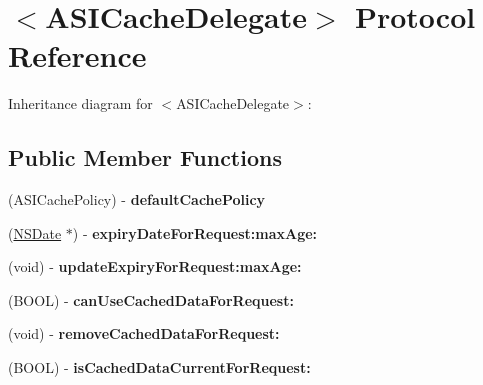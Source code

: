 \hypertarget{protocol_a_s_i_cache_delegate-p}{
\section{$<$\-A\-S\-I\-Cache\-Delegate$>$ \-Protocol \-Reference}
\label{protocol_a_s_i_cache_delegate-p}
}


\-Inheritance diagram for $<$\-A\-S\-I\-Cache\-Delegate$>$\-:
\subsection*{\-Public \-Member \-Functions}
\begin{DoxyCompactItemize}
\item 
\hypertarget{protocol_a_s_i_cache_delegate-p_a1207aea079945294e7bb48c621d82a67}{
(\-A\-S\-I\-Cache\-Policy) -\/ {\bfseries default\-Cache\-Policy}}
\label{protocol_a_s_i_cache_delegate-p_a1207aea079945294e7bb48c621d82a67}

\item 
\hypertarget{protocol_a_s_i_cache_delegate-p_a36d0b83c9017dba94a93acc3cae9aa65}{
(\hyperlink{class_n_s_date}{\-N\-S\-Date} $\ast$) -\/ {\bfseries expiry\-Date\-For\-Request\-:max\-Age\-:}}
\label{protocol_a_s_i_cache_delegate-p_a36d0b83c9017dba94a93acc3cae9aa65}

\item 
\hypertarget{protocol_a_s_i_cache_delegate-p_ad793f424847f6f7a2c5154fb8cec1bb6}{
(void) -\/ {\bfseries update\-Expiry\-For\-Request\-:max\-Age\-:}}
\label{protocol_a_s_i_cache_delegate-p_ad793f424847f6f7a2c5154fb8cec1bb6}

\item 
\hypertarget{protocol_a_s_i_cache_delegate-p_a7cf0deb09983a6b552fd7a2130529c95}{
(\-B\-O\-O\-L) -\/ {\bfseries can\-Use\-Cached\-Data\-For\-Request\-:}}
\label{protocol_a_s_i_cache_delegate-p_a7cf0deb09983a6b552fd7a2130529c95}

\item 
\hypertarget{protocol_a_s_i_cache_delegate-p_a2e34141ed1db825ca2d1c292b068193e}{
(void) -\/ {\bfseries remove\-Cached\-Data\-For\-Request\-:}}
\label{protocol_a_s_i_cache_delegate-p_a2e34141ed1db825ca2d1c292b068193e}

\item 
\hypertarget{protocol_a_s_i_cache_delegate-p_a67c31b3473af7adba4cd548045935ac2}{
(\-B\-O\-O\-L) -\/ {\bfseries is\-Cached\-Data\-Current\-For\-Request\-:}}
\label{protocol_a_s_i_cache_delegate-p_a67c31b3473af7adba4cd548045935ac2}


\end{DoxyCompactItemize}
